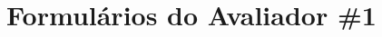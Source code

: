 \documentclass[portuguese,oneside]{tcc}
\begin{document}
	
	
	
	\appendix
	
	\chapter{\label{apnd:form-1-infos}Formulários do Avaliador \#1}
\end{document}
